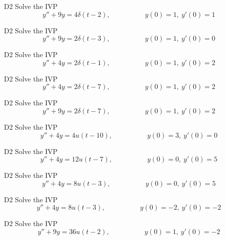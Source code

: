 \begin{problem}{D2}
Solve the IVP
\[y''+9y=4\delta(t-2), \hspace{5em} y(0)=1,\ y'(0)=1\]
\end{problem}


\begin{problem}{D2}
Solve the IVP
\[y''+9y=2\delta(t-3), \hspace{5em} y(0)=1,\ y'(0)=0\]
\end{problem}

\begin{problem}{D2}
Solve the IVP
\[y''+4y=2\delta(t-1), \hspace{5em} y(0)=1,\ y'(0)=2\]
\end{problem}

\begin{problem}{D2}
Solve the IVP
\[y''+4y=2\delta(t-7), \hspace{5em} y(0)=1,\ y'(0)=2\]
\end{problem}

\begin{problem}{D2}
Solve the IVP
\[y''+9y=2\delta(t-7), \hspace{5em} y(0)=1,\ y'(0)=2\]
\end{problem}

\begin{problem}{D2}
Solve the IVP
\[y''+4y=4u(t-10), \hspace{5em} y(0)=3,\ y'(0)=0\]
\end{problem}

\begin{problem}{D2}
Solve the IVP
\[y''+4y=12u(t-7), \hspace{5em} y(0)=0,\ y'(0)=5\]
\end{problem}

\begin{problem}{D2}
Solve the IVP
\[y''+4y=8u(t-3), \hspace{5em} y(0)=0,\ y'(0)=5\]
\end{problem}

\begin{problem}{D2}
Solve the IVP
\[y''+4y=8u(t-3), \hspace{5em} y(0)=-2,\ y'(0)=-2\]
\end{problem}


\begin{problem}{D2}
Solve the IVP
\[y''+9y=36u(t-2), \hspace{5em} y(0)=1,\ y'(0)=-2\]
\end{problem}

